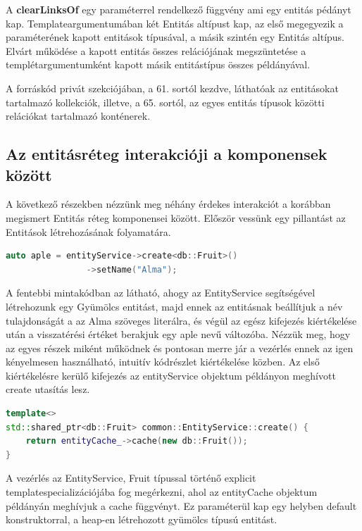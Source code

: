 A \textbf{clearLinksOf} egy paraméterrel rendelkező függvény ami egy entitás pédányt kap. Templateargumentumában két Entitás altípust kap, az első megegyezik a paraméterének kapott entitások típusával, a másik szintén egy Entitás altípus. Elvárt működése a kapott entitás összes relációjának megszüntetése a templétargumentumként kapott másik entitástípus összes példányával.

A forráskód privát szekciójában, a 61. sortól kezdve, láthatóak az entitásokat tartalmazó kollekciók, illetve, a 65. sortól, az egyes entitás típusok közötti relációkat tartalmazó konténerek.

\subsection{Az entitásréteg interakcióji a komponensek között}

A következő részekben nézzünk meg néhány érdekes interakciót a korábban megismert Entitás réteg komponensei között. Először vessünk egy pillantást az Entitások létrehozásának folyamatára.

\begin{lstlisting}[language={C++}]
auto aple = entityService->create<db::Fruit>()
                ->setName("Alma");
\end{lstlisting}

A fentebbi mintakódban az látható, ahogy az EntityService segítségével létrehozunk egy Gyümölcs entitást, majd ennek az entitásnak beállítjuk a név tulajdonságát a az Alma szöveges literálra, és végül az egész kifejezés kiértékelése után a visszatérési értéket berakjuk egy aple nevű változóba. Nézzük meg, hogy az egyes részek miként működnek és pontosan merre jár a vezérlés ennek az igen kényelmesen használható, intuitív kódrészlet kiértékelése közben.
Az első kiértékelésre kerülő kifejezés az entityService objektum példányon meghívott create utasítás lesz.

\begin{lstlisting}[language={C++}]
template<>
std::shared_ptr<db::Fruit> common::EntityService::create() {
    return entityCache_->cache(new db::Fruit());
}
\end{lstlisting}

A vezérlés az EntityService, Fruit típussal történő explicit templatespecializációjába fog megérkezni, ahol az entityCache objektum példányán meghívjuk a cache függvényt. Ez paraméterül kap egy helyben default konstruktorral, a heap-en létrehozott gyümölcs típusú entitást.

